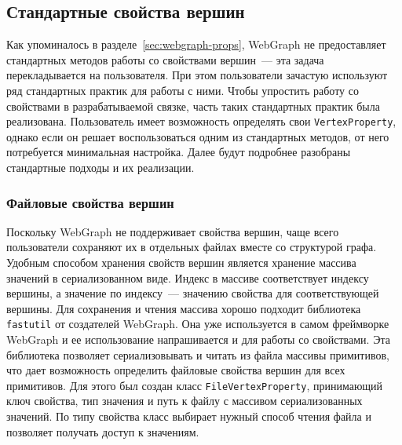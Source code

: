 \documentclass[times,specification,annotation]{itmo-student-thesis}
\begin{document}
\subsection{Стандартные свойства вершин}

Как упоминалось в разделе~\ref{sec:webgraph-props}, WebGraph не предоставляет стандартных методов работы со свойствами вершин~--- эта задача перекладывается на пользователя. При этом пользователи зачастую используют ряд стандартных практик для работы с ними. Чтобы упростить работу со свойствами в разрабатываемой связке, часть таких стандартных практик была реализована. Пользователь имеет возможность определять свои \texttt{VertexProperty}, однако если он решает воспользоваться одним из стандартных методов, от него потребуется минимальная настройка. Далее будут подробнее разобраны стандартные подходы и их реализации. 

\subsubsection{Файловые свойства вершин}

Поскольку WebGraph не поддерживает свойства вершин, чаще всего пользователи сохраняют их в отдельных файлах вместе со структурой графа. Удобным способом хранения свойств вершин является хранение массива значений в сериализованном виде. Индекс в массиве соответствует индексу вершины, а значение по индексу~--- значению свойства для соответствующей вершины. Для сохранения и чтения массива хорошо подходит библиотека \texttt{fastutil} от создателей WebGraph. Она уже используется в самом фреймворке WebGraph и ее использование напрашивается и для работы со свойствами.
Эта библиотека позволяет сериализовывать и читать из файла массивы примитивов, что дает возможность определить файловые свойства вершин для всех примитивов. Для этого был создан класс \texttt{FileVertexProperty}, принимающий ключ свойства, тип значения и путь к файлу с массивом сериализованных значений. По типу свойства класс выбирает нужный способ чтения файла и позволяет получать доступ к значениям.
\end{document}
